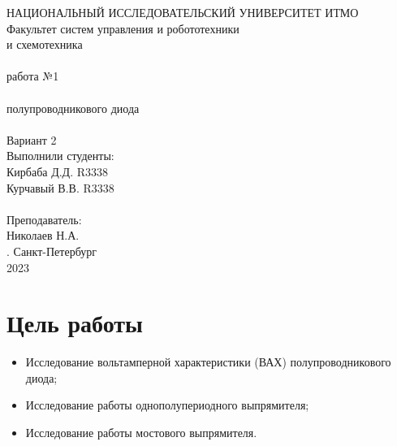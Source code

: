 \documentclass[12pt]{article}
\begin{document}
\begin{titlepage}
\begin{center}
    {\small НАЦИОНАЛЬНЫЙ ИССЛЕДОВАТЕЛЬСКИЙ УНИВЕРСИТЕТ ИТМО} \\
    {\small Факультет систем управления и робототехники} \\
    \vspace*{10\baselineskip}
    { и схемотехника} \\
    \ \\
    { работа №1} \\
    \ \\
    { полупроводникового диода} \\
    \ \\
    Вариант 2 \\
    \vspace*{10\baselineskip}
    \hfill {\small Выполнили студенты:} \\
    \hfill {\small Кирбаба Д.Д. R3338} \\
    \hfill {\small Курчавый В.В. R3338} \\
    \ \\
    \hfill {\small Преподаватель:} \\
    \hfill {\small Николаев Н.А.} \\
    \mbox{}
    \vfill {. Санкт-Петербург\\2023}
\end{center}
\end{titlepage}

\section*{Цель работы}
\begin{itemize}
  \item Исследование вольтамперной характеристики (ВАХ) полупроводникового диода;
  \item Исследование работы однополупериодного выпрямителя;
  \item Исследование работы мостового выпрямителя.
\end{itemize}
\end{document}
